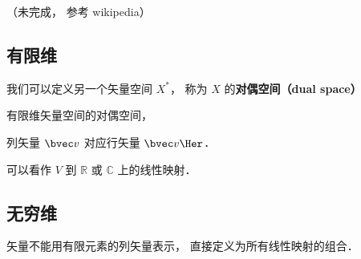 
（未完成， 参考 wikipedia）











\subsection{有限维}
我们可以定义另一个矢量空间 $X^*$， 称为 $X$ 的\textbf{对偶空间（dual space）}

有限维矢量空间的对偶空间， 

列矢量 $\bvec v$ 对应行矢量 $\bvec v\Her$．

可以看作 $V$ 到 $\mathbb R$ 或 $\mathbb C$ 上的线性映射．

\subsection{无穷维}
矢量不能用有限元素的列矢量表示， 直接定义为所有线性映射的组合．
